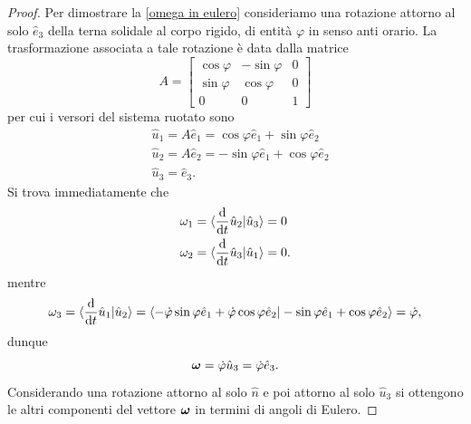     \begin{proof}
        Per dimostrare la \ref{omega in eulero} consideriamo una rotazione attorno al solo $\hat{e}_3$ della terna solidale al corpo rigido, di entità $\varphi$ in senso anti orario. La trasformazione associata a tale rotazione è data dalla matrice
        \begin{equation}
            A = \begin{bmatrix}
                \cos \varphi & -\sin \varphi &0\\
                \sin\varphi &\cos\varphi & 0\\
                0 & 0 & 1
            \end{bmatrix}
        \end{equation}
        per cui i versori del sistema ruotato sono 
        \begin{equation}
        \begin{aligned}
            &\hat{u}_1 = A \hat{e}_1 =\cos \varphi \hat{e}_1+\sin\varphi\hat{e}_2\\
            &\hat{u}_2 = A \hat{e}_2 =-\sin \varphi \hat{e}_1+\cos\varphi\hat{e}_2\\
            &\hat{u}_3 = \hat{e}_3.
        \end{aligned}
        \end{equation}
        Si trova immediatamente che
        \begin{equation}
            \begin{aligned}
                &\omega_1 = \braket{\frac{\mathrm{d}}{\mathrm{d}t} \hat{u}_2|\hat{u}_3}=0\\
                &\omega_2 = \braket{\frac{\mathrm{d}}{\mathrm{d}t} \hat{u}_3|\hat{u}_1}=0.
            \end{aligned}
        \end{equation}
        mentre
        \begin{equation}
            \omega_3 = \braket{\frac{\mathrm{d}}{\mathrm{d}t} \hat{u}_1|\hat{u}_2} = \braket{-\dot{\varphi}\sin\varphi\hat{e}_1+\dot{\varphi}\cos\varphi \hat{e}_2|-\sin \varphi \hat{e}_1+\cos\varphi\hat{e}_2} = \dot{\varphi},
        \end{equation}
        dunque
        \begin{equation}
            \boldsymbol{\omega} = \dot{\varphi}\hat{u}_3=\dot{\varphi}\hat{e}_3.
        \end{equation}
        Considerando una rotazione attorno al solo $\hat{n}$ e poi attorno al solo $\hat{u}_3$ si ottengono le altri componenti del vettore $\boldsymbol{\omega}$ in termini di angoli di Eulero.


\end{proof}
